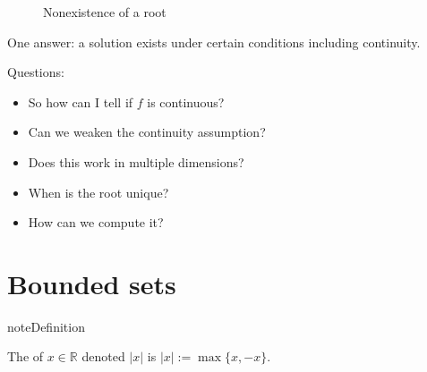 \documentclass[letterpaper,10pt,english]{jupyterBook}
\begin{document}
\begin{figure}[htbp]
\centering
\capstart

\noindent{}
\caption{Non\sphinxhyphen{}existence of a root}\label{\detokenize{04.basic_analysis:no-root}}\end{figure}

\sphinxAtStartPar
One answer: a solution exists under certain conditions including continuity.

\sphinxAtStartPar
Questions:
\begin{itemize}
\item {} 
\sphinxAtStartPar
So how can I tell if \(f\) is continuous?

\item {} 
\sphinxAtStartPar
Can we weaken the continuity assumption?

\item {} 
\sphinxAtStartPar
Does this work in multiple dimensions?

\item {} 
\sphinxAtStartPar
When is the root unique?

\item {} 
\sphinxAtStartPar
How can we compute it?

\end{itemize}

\sphinxAtStartPar
{}


\section{Bounded sets}
\label{\detokenize{04.basic_analysis:bounded-sets}}
\begin{sphinxadmonition}{note}{Definition}

\sphinxAtStartPar
The  of \(x \in \mathbb{R}\) denoted \(|x|\) is \(|x| := \max\{x, -x\}\).
\end{sphinxadmonition}
\end{document}
